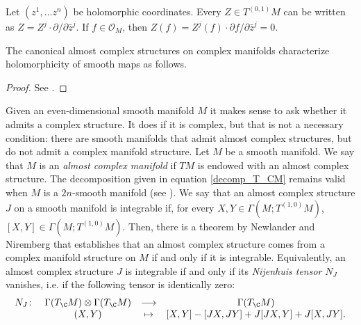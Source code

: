 \begin{obs} \label{holomorp_func_zero}
    Let \((z^1,\ldots z^n)\) be holomorphic coordinates. Every \(Z \in T^{(0,1)}M\) can be written as \(Z=Z^j \cdot \partial/\partial \bar{z}^j\). If \(f \in \mathcal{O}_M\), then \(Z(f)=Z^j(f)\cdot \partial f/\partial \bar{z}^j = 0\).
\end{obs}

The canonical almost complex structures on complex manifolds characterize holomorphicity of smooth maps as follows.

\begin{proof}
    See \parencite[Prop. 1.55]{lee_introCM}.
\end{proof}

Given an even-dimensional smooth manifold \(M\) it makes sense to ask whether it admits a complex structure. It does if it is complex, but that is not a necessary condition: there are smooth manifolds that admit almost complex structures, but do not admit a complex manifold structure. Let \(M\) be a smooth manifold. We say that \(M\) is an \textit{almost complex manifold} if \(TM\) is endowed with an almost complex structure. The decomposition given in equation \eqref{decomp_T_CM} remains valid when \(M\) is a \(2n\)-smooth manifold (see \parencite[Lemma 1.60]{lee_introCM}). We say that an almost complex structure \(J\) on a smooth manifold is integrable if, for every \(X,Y \in \Gamma(M; T^{(1,0)}M)\), \([X,Y] \in \Gamma(M; T^{(1,0)}M)\). Then, there is a theorem by Newlander and Niremberg  that establishes that an almost complex structure comes from a complex manifold structure on \(M\) if and only if it is integrable. Equivalently, an almost complex structure \(J\) is integrable if and only if its \textit{Nijenhuis tensor} \(N_J\) vanishes, i.e. if the following tensor is identically zero:
\[
\begin{array}{cccc}
    N_J\colon& \Gamma(T_\C M) \otimes \Gamma(T_\C M) & \longrightarrow & \Gamma(T_\C M) \\
     & (X,Y) & \mapsto &  [X,Y]-[JX, JY] + J [JX, Y] + J[X, JY].
\end{array}
\]

